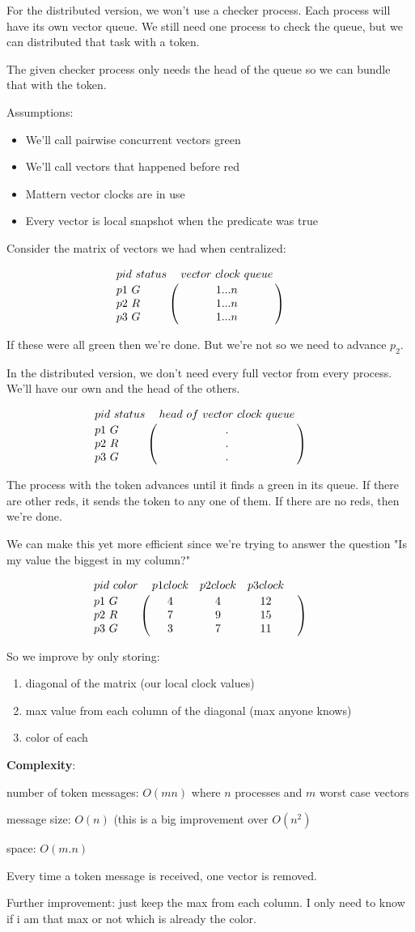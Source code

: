 \documentclass[twoside]{article}
\begin{document}
For the distributed version, we won't use a checker process. Each process will have its own vector queue. We still need one process to check the queue, but we can distributed that task with a token.

The given checker process only needs the head of the queue so we can bundle that with the token.

Assumptions:
\begin{itemize}
\item We'll call pairwise concurrent vectors green
\item We'll call vectors that happened before red
\item Mattern vector clocks are in use
\item Every vector is local snapshot when the predicate was true
\end{itemize}

Consider the matrix of vectors we had when centralized:

\[
    \bordermatrix{ pid \ status & vector \ clock \ queue  \cr
      p1 \ G & 1...n  \cr
      p2 \ R & 1...n \cr
      p3 \ G & 1...n } \qquad
\]


If these were all green then we're done. But we're not so we need to advance $p_2$.

In the distributed version, we don't need every full vector from every process. We'll have our own and the head of the others.

\[
    \bordermatrix{ pid \ status & head \ of \ vector \ clock \ queue  \cr
      p1 \ G & .  \cr
      p2 \ R & . \cr
      p3 \ G & . } \qquad
\]

The process with the token advances until it finds a green in its queue. If there are other reds, it sends the token to any one of them. If there are no reds, then we're done.

We can make this yet more efficient since we're trying to answer the question "Is my value the biggest in my column?"

\[
    \bordermatrix{ pid \ color & p1 clock & p2 clock & p3 clock &  \cr
      p1 \ G & 4 & 4 & 12 \cr
      p2 \ R & 7 & 9 & 15 \cr
      p3 \ G & 3 & 7 & 11 } \qquad
\]

So we improve by only storing:

\begin{enumerate}
    \item diagonal of the matrix (our local clock values)
    \item max value from each column of the diagonal (max anyone knows)
    \item color of each
\end{enumerate}

\textbf{Complexity}:

number of token messages: $O(mn)$ where $n$ processes and $m$ worst case vectors

message size: $O(n)$ (this is a big improvement over $O(n^2)$

space: $O(m.n)$

Every time a token message is received, one vector is removed.

Further improvement: just keep the max from each column. I only need to know if i am that max or not which is already the color.
\end{document}
